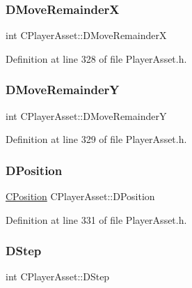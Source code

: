 \subsubsection{\texorpdfstring{D\+Move\+RemainderX}{DMoveRemainderX}}
{\footnotesize\ttfamily int C\+Player\+Asset\+::\+D\+Move\+RemainderX\hspace{0.3cm}{\ttfamily [protected]}}



Definition at line 328 of file Player\+Asset.\+h.

\hypertarget{classCPlayerAsset_a282502fea7d02e38aa40a538a9c1565e}{}\label{classCPlayerAsset_a282502fea7d02e38aa40a538a9c1565e} 
\subsubsection{\texorpdfstring{D\+Move\+RemainderY}{DMoveRemainderY}}
{\footnotesize\ttfamily int C\+Player\+Asset\+::\+D\+Move\+RemainderY\hspace{0.3cm}{\ttfamily [protected]}}



Definition at line 329 of file Player\+Asset.\+h.

\hypertarget{classCPlayerAsset_aa9f53c009b181c7c5647c6b03776a04c}{}\label{classCPlayerAsset_aa9f53c009b181c7c5647c6b03776a04c} 
\subsubsection{\texorpdfstring{D\+Position}{DPosition}}
{\footnotesize\ttfamily \hyperlink{classCPosition}{C\+Position} C\+Player\+Asset\+::\+D\+Position\hspace{0.3cm}{\ttfamily [protected]}}



Definition at line 331 of file Player\+Asset.\+h.

\hypertarget{classCPlayerAsset_a7964d2161d51b3edd66fbc9c59eba4b0}{}\label{classCPlayerAsset_a7964d2161d51b3edd66fbc9c59eba4b0} 
\subsubsection{\texorpdfstring{D\+Step}{DStep}}
{\footnotesize\ttfamily int C\+Player\+Asset\+::\+D\+Step\hspace{0.3cm}{\ttfamily [protected]}}



